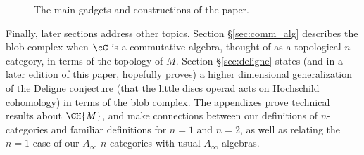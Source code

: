 \begin{figure}[!ht]
{\center


}
\caption{The main gadgets and constructions of the paper.}
\label{fig:outline}
\end{figure}

Finally, later sections address other topics. Section \S \ref{sec:comm_alg} describes the blob complex when $\cC$ is a commutative algebra, thought of as a topological $n$-category, in terms of the topology of $M$. Section \S \ref{sec:deligne} states (and in a later edition of this paper, hopefully proves) a higher dimensional generalization of the Deligne conjecture (that the little discs operad acts on Hochschild cohomology) in terms of the blob complex. The appendixes prove technical results about $\CH{M}$, and make connections between our definitions of $n$-categories and familiar definitions for $n=1$ and $n=2$, as well as relating the $n=1$ case of our $A_\infty$ $n$-categories with usual $A_\infty$ algebras.


